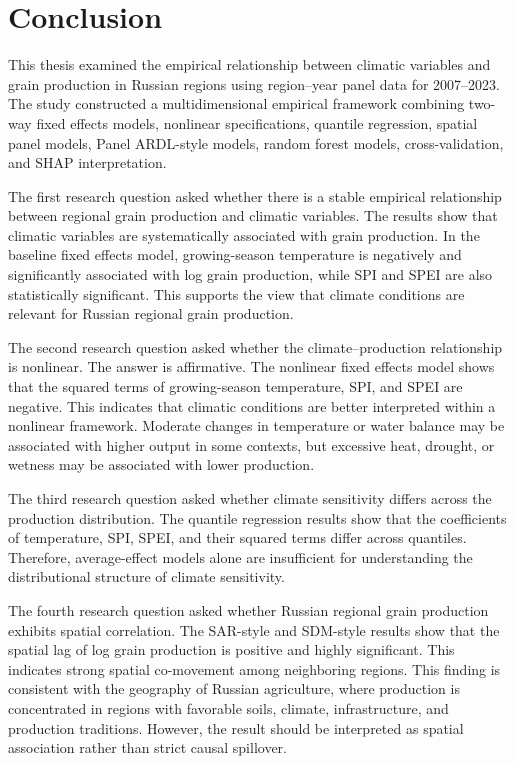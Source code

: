 \documentclass[12pt,a4paper]{article}
\begin{document}
\section{Conclusion}

This thesis examined the empirical relationship between climatic variables and grain production in Russian regions using region--year panel data for 2007--2023. The study constructed a multidimensional empirical framework combining two-way fixed effects models, nonlinear specifications, quantile regression, spatial panel models, Panel ARDL-style models, random forest models, cross-validation, and SHAP interpretation.

The first research question asked whether there is a stable empirical relationship between regional grain production and climatic variables. The results show that climatic variables are systematically associated with grain production. In the baseline fixed effects model, growing-season temperature is negatively and significantly associated with log grain production, while SPI and SPEI are also statistically significant. This supports the view that climate conditions are relevant for Russian regional grain production.

The second research question asked whether the climate--production relationship is nonlinear. The answer is affirmative. The nonlinear fixed effects model shows that the squared terms of growing-season temperature, SPI, and SPEI are negative. This indicates that climatic conditions are better interpreted within a nonlinear framework. Moderate changes in temperature or water balance may be associated with higher output in some contexts, but excessive heat, drought, or wetness may be associated with lower production.

The third research question asked whether climate sensitivity differs across the production distribution. The quantile regression results show that the coefficients of temperature, SPI, SPEI, and their squared terms differ across quantiles. Therefore, average-effect models alone are insufficient for understanding the distributional structure of climate sensitivity.

The fourth research question asked whether Russian regional grain production exhibits spatial correlation. The SAR-style and SDM-style results show that the spatial lag of log grain production is positive and highly significant. This indicates strong spatial co-movement among neighboring regions. This finding is consistent with the geography of Russian agriculture, where production is concentrated in regions with favorable soils, climate, infrastructure, and production traditions. However, the result should be interpreted as spatial association rather than strict causal spillover.
\end{document}
